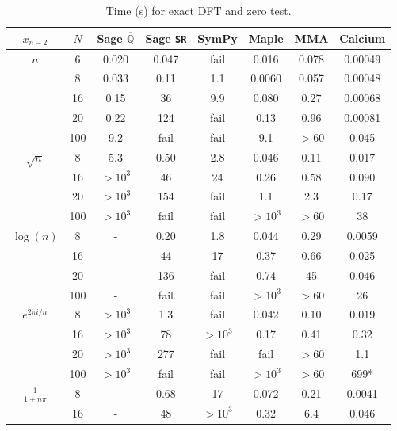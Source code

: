 \documentclass[11pt,a4paper]{article}
\begin{document}
{\renewcommand{\arraystretch}{0.9}
\begin{table}
\centering
\caption{Time (s) for exact DFT and zero test.}
\label{tab:dft}
\begin{tabular}{ c c c c c c c c }
$x_{n-2}$  & $N$ & \!\!Sage $\overline{\mathbb{Q}}$\!\! & \!\!Sage \texttt{SR}\!\! & \!\!SymPy\!\! & \!\!Maple\!\! & \!\!MMA\!\! & \!\!Calcium\!\! \\
 \hline
\multirow{4}{*}{$n$} & 6   & 0.020 & 0.047 & fail & 0.016 & 0.078   & 0.00049 \\
  & 8 & 0.033   & 0.11  & 1.1    & 0.0060 &  0.057 & 0.00048 \\
  & 16  & 0.15  & 36    & 9.9    & 0.080 &  0.27    & 0.00068 \\
  & 20  & 0.22  & 124   & fail   & 0.13 &  0.96    & 0.00081 \\
  & 100 & 9.2   & fail  & fail   & 9.1 &  $>60$ & 0.045 \\
\hline
\multirow{4}{*}{$\sqrt{n}$} & 8  &   5.3  &   0.50  &   2.8   & 0.046 &   0.11  &   0.017 \\
 & 16  &   $>10^3$  &   46  &   24  & 0.26 &    0.58   &  0.090 \\
 & 20  &   $>10^3$  &   154 &    fail  & 1.1 &    2.3   &  0.17 \\
 & 100 &    $>10^3$  &   fail  &   fail  & $>10^3$ &    $>60$   &  38 \\
\hline
\multirow{4}{*}{$\log(n)$\!\!\!\!} & 8  &   -  &   0.20  &   1.8   & 0.044 &   0.29  &   0.0059 \\
 & 16  &   -  &   44  &   17 & 0.37 &     0.66  &   0.025 \\
 & 20  &   -  &   136   &  fail  & 0.74 &    45  &   0.046 \\
 & 100  &   - &    fail   &  fail  &  $>10^3$ &   $>60$  &   26 \\
\hline
\multirow{4}{*}{\!\!$e^{2\pi i/n}$\!\!\!\!\!\!} & 8  &   $>10^3$  &   1.3  &   fail  &  0.042 &   0.10  &   0.019 \\
  & 16  &   $>10^3$  &   78   &  $>10^3$  &  0.17 &   0.41  &   0.32 \\
  & 20  &   $>10^3$  &   277   &  fail  &   fail &  $>60$  &   1.1 \\
  & 100 &    $>10^3$  &   fail  &   fail  &  $>10^3$ &   $>60$  &   699* \\
\hline
\multirow{4}{*}{\!\!$\frac{1}{1+n\pi}$\!\!\!\!\!\!} & 8  &   -   &  0.68  &   17  &  0.072 &   0.21  &   0.0041 \\
  & 16  &   -   &  48  &   $>10^3$  &  0.32 &   6.4  &   0.046 \\

\end{tabular}
\end{table}}
\end{document}
